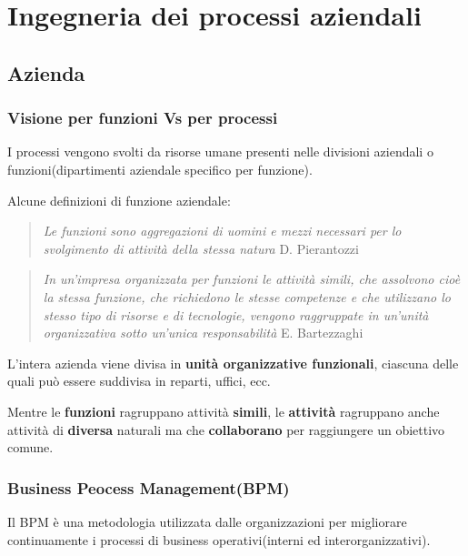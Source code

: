 

\chapter{Ingegneria dei processi aziendali}


\section{Azienda}
\subsection{Visione per funzioni Vs per processi}

I processi vengono svolti da risorse umane presenti nelle
divisioni aziendali o funzioni(dipartimenti aziendale
specifico per funzione).

Alcune definizioni di funzione aziendale:
\begin{quote}
	\textit{
		Le funzioni sono aggregazioni di uomini e
		mezzi necessari per lo svolgimento di
		attività della stessa natura
	}
	D. Pierantozzi
\end{quote}

\begin{quote}
	\textit{
		In un’impresa organizzata per funzioni le
		attività simili, che assolvono cioè la
		stessa funzione, che richiedono le
		stesse competenze e che utilizzano lo
		stesso tipo di risorse e di tecnologie,
		vengono raggruppate	in	un’unità	organizzativa
		sotto	un’unica	responsabilità
	}
	E. Bartezzaghi
\end{quote}


L'intera azienda viene divisa in \textbf{unità organizzative funzionali},
ciascuna delle quali può essere suddivisa in reparti, uffici, ecc.


Mentre le \textbf{funzioni} ragruppano attività \textbf{simili},
le \textbf{attività} ragruppano anche attività di \textbf{diversa}
naturali ma che \textbf{collaborano} per raggiungere un obiettivo comune.



\subsection{Business Peocess Management(BPM)}
Il BPM è una metodologia utilizzata dalle organizzazioni per migliorare continuamente
i processi di business operativi(interni ed interorganizzativi).

